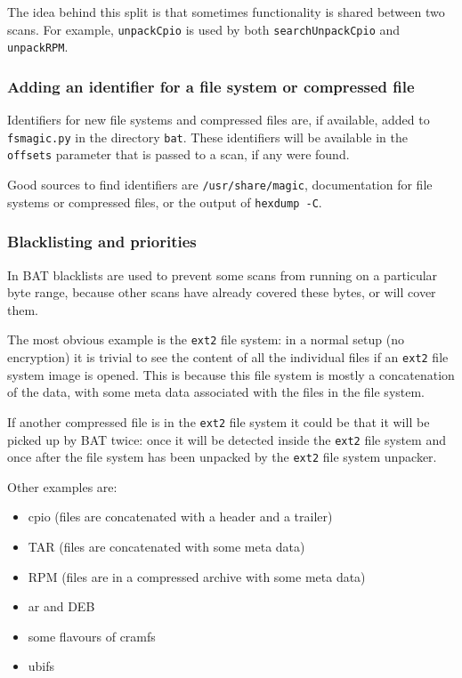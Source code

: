 \documentclass[10pt,a4paper]{article}
\begin{document}
The idea behind this split is that sometimes functionality is shared between
two scans. For example, \texttt{unpackCpio} is used by both
\texttt{searchUnpackCpio} and \texttt{unpackRPM}.

\subsubsection{Adding an identifier for a file system or compressed file}

Identifiers for new file systems and compressed files are, if available, added
to \texttt{fsmagic.py} in the directory \texttt{bat}. These identifiers will be
available in the \texttt{offsets} parameter that is passed to a scan, if any
were found.

Good sources to find identifiers are \texttt{/usr/share/magic}, documentation
for file systems or compressed files, or the output of \texttt{hexdump -C}.

\subsubsection{Blacklisting and priorities}

In BAT blacklists are used to prevent some scans from running on a particular
byte range, because other scans have already covered these bytes, or will cover
them.

The most obvious example is the \texttt{ext2} file system: in a normal setup
(no encryption) it is trivial to see the content of all the individual files
if an \texttt{ext2} file system image is opened. This is because this file
system is mostly a concatenation of the data, with some meta data associated
with the files in the file system.

If another compressed file is in the \texttt{ext2} file system it could be that
it will be picked up by BAT twice: once it will be detected inside the
\texttt{ext2} file system and once after the file system has been unpacked by
the \texttt{ext2} file system unpacker.

Other examples are:

\begin{itemize}
\item cpio (files are concatenated with a header and a trailer)
\item TAR (files are concatenated with some meta data)
\item RPM (files are in a compressed archive with some meta data)
\item ar and DEB
\item some flavours of cramfs
\item ubifs
\end{itemize}
\end{document}
